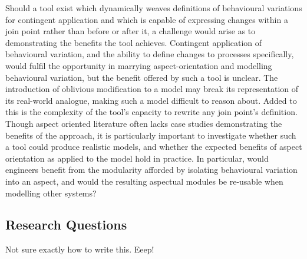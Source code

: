 Should a tool exist which dynamically weaves definitions of behavioural
variations for contingent application and which is capable of expressing changes
within a join point rather than before or after it, a challenge would arise as
to demonstrating the benefits the tool achieves. Contingent application of
behavioural variation, and the ability to define changes to processes
specifically, would fulfil the opportunity in marrying aspect-orientation and
modelling behavioural variation, but the benefit offered by such a tool is
unclear. The introduction of oblivious modification to a model may break its
representation of its real-world analogue, making such a model difficult to
reason about. Added to this is the complexity of the tool's capacity to rewrite
any join point's definition. Though aspect oriented literature often lacks case
studies demonstrating the benefits of the approach, it is particularly important
to investigate whether such a tool could produce realistic models, and whether
the expected benefits of aspect orientation as applied to the model hold in
practice. In particular, would engineers benefit from the modularity afforded
by isolating behavioural variation into an aspect, and would the resulting
aspectual modules be re-usable when modelling other systems?

\subsection{Research Questions}\label{subsec:rqs}

Not sure exactly how to write this. Eeep!


